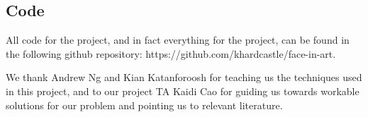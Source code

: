 \documentclass{pnastwo2}
\begin{document}
\begin{article}
\section{Code}

All code for the project, and in fact everything for the project, can be found in the following github repository: https://github.com/khardcastle/face-in-art.


\begin{acknowledgments}
We thank Andrew Ng and Kian Katanforoosh for teaching us the techniques used in this project, and to our project TA Kaidi Cao for guiding us towards workable solutions for our problem and pointing us to relevant literature.
\end{acknowledgments}




\end{article}
\end{document}
